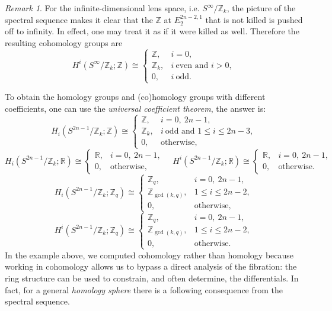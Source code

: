 \documentclass[a4paper,11pt]{article}
\theoremstyle{definition}
\theoremstyle{remark}
\newtheorem{remark}[theorem]{Remark}
\begin{document}
\begin{remark}
	For the infinite-dimensional lens space, i.e. $S^\infty/\mathbb{Z}_k$, the picture of the spectral sequence makes it clear that the $\mathbb{Z}$ at $E_2^{2n-2,1}$ that is not killed is pushed off to infinity. In effect, one may treat it as if it were killed as well. Therefore the resulting cohomology groups are
	\[
	H^i(S^\infty/\mathbb{Z}_k;\mathbb{Z})\cong
	\begin{cases}
		\mathbb{Z}, & i=0,\\
		\mathbb{Z}_k, & i\ \text{even and } i>0,\\
		0, & i\ \text{odd}.
	\end{cases}
	\]
\end{remark}
To obtain the homology groups and (co)homology groups with different coefficients, one can use the {\itshape universal coefficient theorem}, the answer is:
$$
	H_i\left(S^{2n-1}/\mathbb{Z}_k;\mathbb Z\right)\cong
	\begin{cases}
		\mathbb Z, & i=0,\ 2n-1,\\
		\mathbb Z_k, & i\ \text{odd and } 1\le i\le 2n-3,\\
		0, & \text{otherwise},
	\end{cases}
$$
$$
H_i\left(S^{2n-1}/\mathbb{Z}_k;\mathbb R\right)\cong
\begin{cases}
	\mathbb R, & i=0,\ 2n-1,\\
	0, & \text{otherwise},
\end{cases}
\quad
H^i\!\left(S^{2n-1}/\mathbb{Z}_k;\mathbb R\right)\cong
\begin{cases}
\mathbb R, & i=0,\ 2n-1,\\
0, & \text{otherwise}.
\end{cases}
$$
\[
H_i\!\left(S^{2n-1}/\mathbb{Z}_k;\mathbb Z_q\right)\cong
\begin{cases}
	\mathbb Z_q, & i=0,\ 2n-1,\\
	\mathbb Z_{\gcd(k,q)}, & 1\le i\le 2n-2,\\
	0, & \text{otherwise},
\end{cases}
\]
\[
H^i\!\left(S^{2n-1}/\mathbb{Z}_k;\mathbb Z_q\right)\cong
\begin{cases}
	\mathbb Z_q, & i=0,\ 2n-1,\\
	\mathbb Z_{\gcd(k,q)}, & 1\le i\le 2n-2,\\
	0, & \text{otherwise}.
\end{cases}
\]
In the example above, we computed cohomology rather than homology because working in cohomology allows us to bypass a direct analysis of the fibration: the ring structure can be used to constrain, and often determine, the differentials. In fact, for a general {\itshape homology sphere} there is a following consequence from the spectral sequence.
\end{document}
